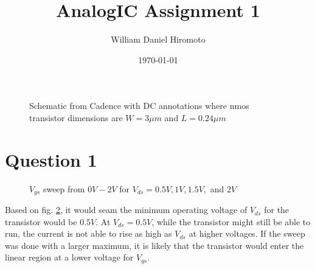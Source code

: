 \documentclass[12pt, letterpaper, notitlepage, DIV=16, BCOR=1mm, headlines=2]{scrreprt}
\title{AnalogIC Assignment 1}
\author{William Daniel Hiromoto}
\date{\today}
\makeatletter
\newcommand*{\tocontents}{\@starttoc{toc}}
\makeatother
\begin{document}
\maketitle

\begin{figure}[h]
	\caption{Schematic from Cadence with DC annotations where nmos transistor dimensions are $W = 3\mu m$ and $L = 0.24\mu m$}
	\label{fig:Schematic}
\end{figure}

\pagebreak
\section*{Question 1}

\begin{figure}[h]
	\caption{$V_{gs}$ sweep from $0V-2V$ for $V_{ds}= 0.5V, 1V, 1.5V,$ and $2V$}
	\label{fig:q1}
\end{figure}

Based on fig. \ref{fig:q1},
it would seam the minimum operating voltage of $V_{ds}$ for the transistor would be $0.5V$. At $V_{ds} = 0.5V$, 
while the transistor might still be able to run, the current is not able to rise as high as $V_{ds}$ 
at higher voltages. If the sweep was done with a larger maximum, it is likely that the transistor would
enter the linear region at a lower voltage for $V_{gs}$.
\end{document}
